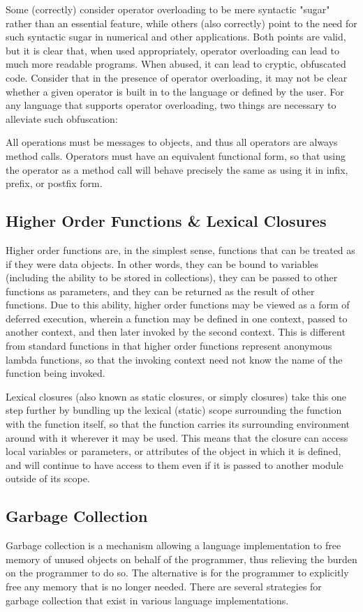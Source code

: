 \documentclass[12pt,a4paper,final,twoside,onecolumn,titlepage]{book}
\begin{document}
Some (correctly) consider operator overloading to be mere syntactic "sugar" rather than an essential feature, while others (also correctly) point to the need for such syntactic sugar in numerical and other applications. Both points are valid, but it is clear that, when used appropriately, operator overloading can lead to much more readable programs. When abused, it can lead to cryptic, obfuscated code. Consider that in the presence of operator overloading, it may not be clear whether a given operator is built in to the language or defined by the user. For any language that supports operator overloading, two things are necessary to alleviate such obfuscation:

All operations must be messages to objects, and thus all operators are always method calls.
Operators must have an equivalent functional form, so that using the operator as a method call will behave precisely the same as using it in infix, prefix, or postfix form.

\subsection{Higher Order Functions \& Lexical Closures}
Higher order functions are, in the simplest sense, functions that can be treated as if they were data objects. In other words, they can be bound to variables (including the ability to be stored in collections), they can be passed to other functions as parameters, and they can be returned as the result of other functions. Due to this ability, higher order functions may be viewed as a form of deferred execution, wherein a function may be defined in one context, passed to another context, and then later invoked by the second context. This is different from standard functions in that higher order functions represent anonymous lambda functions, so that the invoking context need not know the name of the function being invoked.

Lexical closures (also known as static closures, or simply closures) take this one step further by bundling up the lexical (static) scope surrounding the function with the function itself, so that the function carries its surrounding environment around with it wherever it may be used. This means that the closure can access local variables or parameters, or attributes of the object in which it is defined, and will continue to have access to them even if it is passed to another module outside of its scope.

\subsection{Garbage Collection}
Garbage collection is a mechanism allowing a language implementation to free memory of unused objects on behalf of the programmer, thus relieving the burden on the programmer to do so. The alternative is for the programmer to explicitly free any memory that is no longer needed. There are several strategies for garbage collection that exist in various language implementations.
\end{document}
